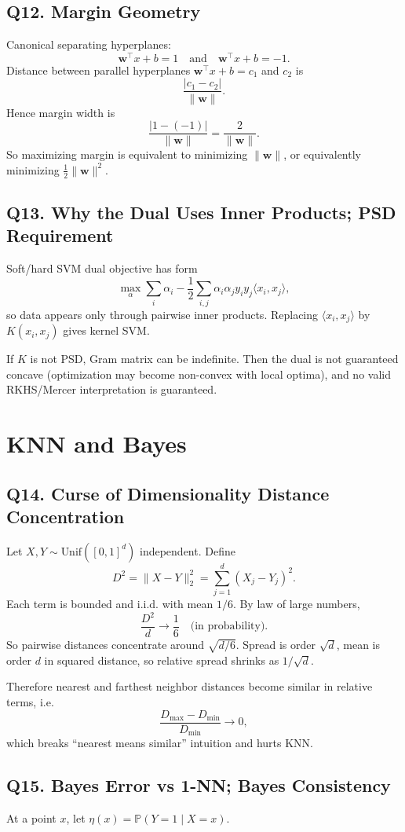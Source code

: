 \documentclass[11pt]{article}
\newcommand{\Pp}{\mathbb{P}}
\newcommand{\1}{\mathbf{1}}
\newcommand{\ww}{\mathbf{w}}
\begin{document}
\subsection*{Q12. Margin Geometry}
Canonical separating hyperplanes:
\[
\ww^\top x+b=1\quad\text{and}\quad \ww^\top x+b=-1.
\]
Distance between parallel hyperplanes $\ww^\top x+b=c_1$ and $c_2$ is
\[
\frac{|c_1-c_2|}{\|\ww\|}.
\]
Hence margin width is
\[
\frac{|1-(-1)|}{\|\ww\|}=\frac{2}{\|\ww\|}.
\]
So maximizing margin is equivalent to minimizing $\|\ww\|$, or equivalently minimizing $\frac12\|\ww\|^2$.

\subsection*{Q13. Why the Dual Uses Inner Products; PSD Requirement}
Soft/hard SVM dual objective has form
\[
\max_\alpha\sum_i\alpha_i-\frac12\sum_{i,j}\alpha_i\alpha_j y_i y_j\langle x_i,x_j\rangle,
\]
so data appears only through pairwise inner products. Replacing
$\langle x_i,x_j\rangle$ by $K(x_i,x_j)$ gives kernel SVM.

If $K$ is not PSD, Gram matrix can be indefinite. Then the dual is not guaranteed concave (optimization may become non-convex with local optima), and no valid RKHS/Mercer interpretation is guaranteed.

\section{KNN and Bayes}

\subsection*{Q14. Curse of Dimensionality Distance Concentration}
Let $X,Y\sim\text{Unif}([0,1]^d)$ independent. Define
\[
D^2=\|X-Y\|_2^2=\sum_{j=1}^d (X_j-Y_j)^2.
\]
Each term is bounded and i.i.d. with mean $1/6$. By law of large numbers,
\[
\frac{D^2}{d}\to\frac16\quad\text{(in probability)}.
\]
So pairwise distances concentrate around $\sqrt{d/6}$. Spread is order $\sqrt d$, mean is order $d$ in squared distance, so relative spread shrinks as $1/\sqrt d$.

Therefore nearest and farthest neighbor distances become similar in relative terms, i.e.
\[
\frac{D_{\max}-D_{\min}}{D_{\min}}\to0,
\]
which breaks ``nearest means similar'' intuition and hurts KNN.

\subsection*{Q15. Bayes Error vs 1-NN; Bayes Consistency}
At a point $x$, let $\eta(x)=\Pp(Y=1\mid X=x)$.
\end{document}
